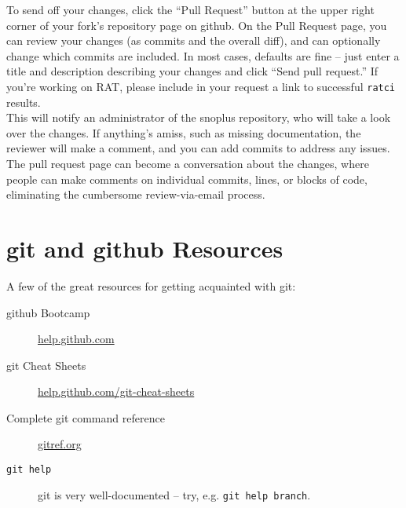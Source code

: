 \documentclass{article}
\begin{document}
To send off your changes, click the ``Pull Request'' button at the upper right corner of your fork's repository page on github. On the Pull Request page, you can review your changes (as commits and the overall diff), and can optionally change which commits are included. In most cases, defaults are fine -- just enter a title and description describing your changes and click ``Send pull request.'' If you're working on RAT, please include in your request a link to successful {\tt ratci} results.\\

This will notify an administrator of the snoplus repository, who will take a look over the changes. If anything's amiss, such as missing documentation, the reviewer will make a comment, and you can add commits to address any issues. The pull request page can become a conversation about the changes, where people can make comments on individual commits, lines, or blocks of code, eliminating the cumbersome review-via-email process.

\section{git and github Resources}
A few of the great resources for getting acquainted with git:
\begin{description}
\item[github Bootcamp] \href{http://help.github.com}{help.github.com}
\item[git Cheat Sheets] \href{http://help.github.com/git-cheat-sheets}{help.github.com/git-cheat-sheets}
\item[Complete git command reference] \href{http://gitref.org}{gitref.org}
\item[{\tt git help}] git is very well-documented -- try, e.g. {\tt git help branch}.
\end{description}


\end{document}

